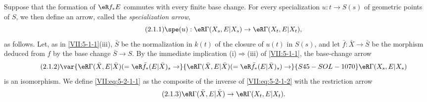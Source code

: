 Suppose that the formation of $\eR f_\ast E$ commutes with every finite base
change. For every specialization $u:t\to S(s)$ of geometric points of $S$,
we then define an arrow, called the \emph{specialization arrow},
\begin{equation*}\tag{2.1.1}\label{VII:eq:5-2-1-1}
  \spe(u):\eR\Gamma(X_s,E|X_s) \to \eR\Gamma(X_t,E|X_t) \text{,}
\end{equation*}
as follows. Let, as in \ref{VII:5-1-1}(iii), $\bar S$ be the normalization in
$k(t)$ of the closure of $u(t)$ in $S(s)$, and let
$\bar f:\bar X\to \bar S$ be the morphism deduced from $f$ by the base change
$\bar S\to S$. By the immediate implication (i)$\Rightarrow$(iii) of
\ref{VII:5-1-1}, the base-change arrow
\begin{equation*}\tag{2.1.2}\label{VII:eq:5-2-1-2}
  \var{\eR\Gamma(\bar X,E|\bar X) (=\eR\bar f_\ast (E|\bar X)_s \to}{\eR\Gamma(\bar X,E|\bar X) (=\eR\bar f_\ast (E|\bar X)_s) \to}{S45-SOL-1070} \eR\Gamma(X_s,E|X_s) 
\end{equation*}
is an isomorphism. We define \eqref{VII:eq:5-2-1-1} as the composite of the
inverse of \eqref{VII:eq:5-2-1-2} with the restriction arrow
\begin{equation*}\tag{2.1.3}\label{VII:eq:5-2-1-3}
  \eR\Gamma(\bar X,E|\bar X) \to \eR\Gamma(X_t,E|X_t) \text{.}
\end{equation*}






\subsubsection{}\label{VII:5-2-2}

